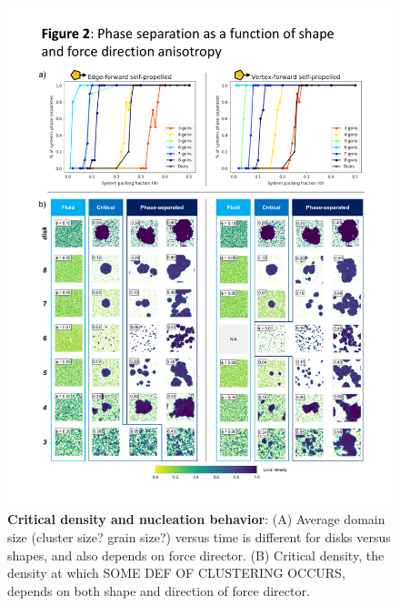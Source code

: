 \begin{figure}[t]
\begin{center}
\includegraphics[width=6.5in]{../figures/Fig2.pdf}
\caption{\textbf{Critical density and nucleation behavior}: (A) Average domain size (cluster size? grain size?) versus time is different for disks versus shapes, and also depends on force director. (B) Critical density, the density at which SOME DEF OF CLUSTERING OCCURS, depends on both shape and direction of force director.}
\label{fig:phase_diagram}
\end{center}
\end{figure}

